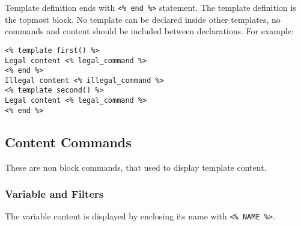 \documentclass{article}
\begin{document}
Template definition ends with \verb+<% end %>+ statement. The template definition is the topmost block. No template can be declared inside other templates, no commands and content should be included between declarations. For example:

\begin{verbatim}
<% template first() %>
Legal content <% legal_command %>
<% end %>
Illegal content <% illegal_command %>
<% template second() %>
Legal content <% legal_command %>
<% end %>
\end{verbatim}

\subsection{Content Commands} 
These are non block commands, that used to display template content.

\subsubsection{Variable and Filters}
The variable content is displayed by enclosing its name with \verb+<% NAME %>+. 
\end{document}
